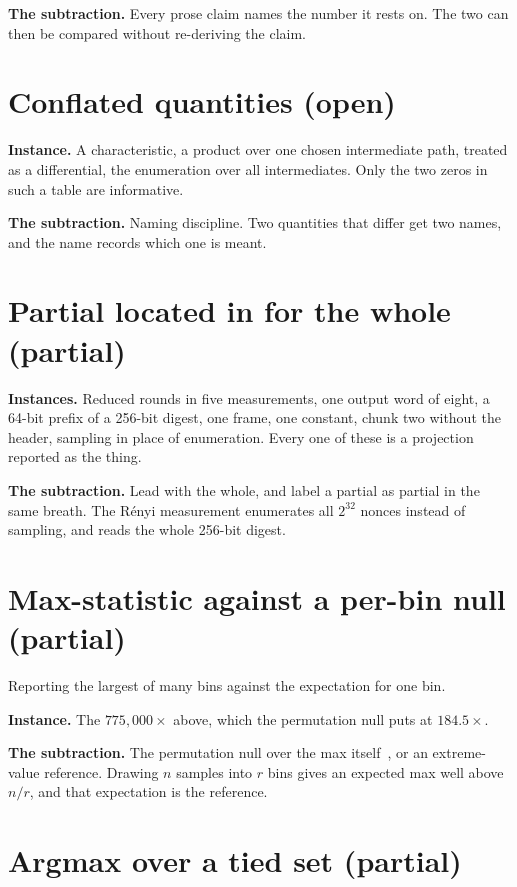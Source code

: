 \textbf{The subtraction.} Every prose claim names the number it rests on. The two can then be compared without re-deriving the claim.

\section{Conflated quantities (open)}

\textbf{Instance.} A characteristic, a product over one chosen intermediate path, treated as a differential, the enumeration over all intermediates. Only the two zeros in such a table are informative.

\textbf{The subtraction.} Naming discipline. Two quantities that differ get two names, and the name records which one is meant.

\section{Partial located in for the whole (partial)}

\textbf{Instances.} Reduced rounds in five measurements, one output word of eight, a 64-bit prefix of a 256-bit digest, one frame, one constant, chunk two without the header, sampling in place of enumeration. Every one of these is a projection reported as the thing.

\textbf{The subtraction.} Lead with the whole, and label a partial as partial in the same breath. The Rényi measurement enumerates all \(2^{32}\) nonces instead of sampling, and reads the whole 256-bit digest.

\section{Max-statistic against a per-bin null (partial)}

Reporting the largest of many bins against the expectation for one bin.

\textbf{Instance.} The \(775{,}000\times\) above, which the permutation null puts at \(184.5\times\).

\textbf{The subtraction.} The permutation null over the max itself~\cite{src:Westfall-and-Young-1993}, or an extreme-value reference. Drawing \(n\) samples into \(r\) bins gives an expected max well above \(n/r\), and that expectation is the reference.

\section{Argmax over a tied set (partial)}

